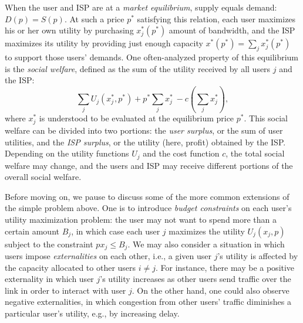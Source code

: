 When the user and ISP are at a \emph{market equilibrium}, supply equals demand: $D(p) = S(p)$. At such a price $p^\ast$ satisfying this relation, each user maximizes his or her own utility by purchasing $x_j^\ast\left(p^\ast\right)$ amount of bandwidth, and the ISP maximizes its utility by providing just enough capacity $x^\ast\left(p^\ast\right) = \sum_j x_j^\ast\left(p^\ast\right)$ to support those users' demands.
%
One often-analyzed property of this equilibrium is the \emph{social welfare}, defined as the sum of the utility received by all users $j$ and the ISP:
\begin{equation*}
\sum_j U_j\left(x_j^\ast,p^\ast\right) + p^\ast\sum_j x_j^\ast\ - c\left(\sum_j x_j^\ast\right),
\end{equation*}
where $x_j^\ast$ is understood to be evaluated at the equilibrium price $p^\ast$. This social welfare can be divided into two portions: the \emph{user surplus}, or the sum of user utilities, and the \emph{ISP surplus}, or the utility (here, profit) obtained by the ISP. Depending on the utility functions $U_j$ and the cost function $c$, the total social welfare may change, and the users and ISP may receive different portions of the overall social welfare.

Before moving on, we pause to discuss some of the more common extensions of the simple problem above. One is to introduce \emph{budget constraints} on each user's utility maximization problem: the user may not want to spend more than a certain amount $B_j$, in which case each user $j$ maximizes the utility $U_j(x_j,p)$ subject to the constraint $px_j \leq B_j$. We may also consider a situation in which users impose \emph{externalities} on each other, i.e., a given user $j$'s utility is affected by the capacity allocated to other users $i\neq j$. For instance, there may be a positive externality in which user $j$'s utility increases as other users send traffic over the link in order to interact with user $j$. On the other hand, one could also observe negative externalities, in which congestion from other users' traffic diminishes a particular user's utility, e.g., by increasing delay.

